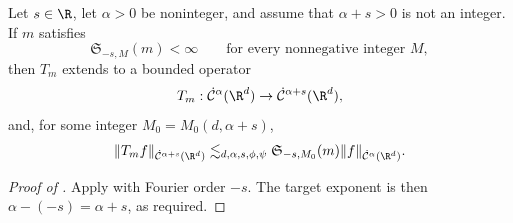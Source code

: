 \begin{corollary}
  \label{cor:smoothing-sign-convention}
  Let \(s \in \R\), let \(\alpha > 0\) be noninteger, and assume that
  \(\alpha + s > 0\) is not an integer. If \(m\) satisfies
  \[
    \mathfrak{S}_{-s, M}(m) < \infty
    \qquad
    \text{for every nonnegative integer } M,
  \]
  then \(T_m\) extends to a bounded operator
  \[
    T_m :
    \dot{\mathcal{C}}^{\alpha}(\R^d)
    \to
    \dot{\mathcal{C}}^{\alpha + s}(\R^d),
  \]
  and, for some integer \(M_0 = M_0(d,\alpha+s)\),
  \begin{equation}
    \label{eq:smoothing-sign-convention-bound}
    \|T_m f\|_{\dot{\mathcal{C}}^{\alpha+s}(\R^d)}
    \lesssim_{d, \alpha, s, \phi, \psi}
    \mathfrak{S}_{-s, M_0}(m)
    \|f\|_{\dot{\mathcal{C}}^{\alpha}(\R^d)}.
  \end{equation}
\end{corollary}

\begin{proof}[Proof of ]
  Apply  with Fourier
  order \(-s\). The target exponent is then
  \(\alpha - (-s) = \alpha + s\), as required.
\end{proof}